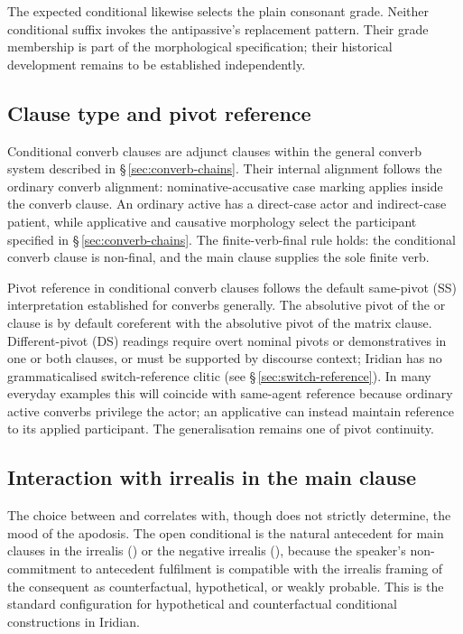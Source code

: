 The expected conditional  likewise selects the plain consonant
grade. Neither conditional suffix invokes the antipassive's replacement
pattern. Their grade membership is part of the morphological specification;
their historical development remains to be established independently.

\subsection{Clause type and pivot reference}\label{sec:cond-subj}

Conditional converb clauses are adjunct clauses within the general converb
system described in §\,\ref{sec:converb-chains}. Their internal alignment
follows the ordinary converb alignment: nominative-accusative case marking
applies inside the converb clause. An ordinary active has a direct-case actor
and indirect-case patient, while applicative and causative morphology select
the participant specified in §\,\ref{sec:converb-chains}. The
finite-verb-final rule holds: the conditional converb clause is non-final, and
the main clause supplies the sole finite verb.

Pivot reference in conditional converb clauses follows the default same-pivot
(SS) interpretation established for converbs generally. The absolutive pivot of
the  or  clause is by default coreferent with the absolutive
pivot of the matrix clause. Different-pivot (DS) readings require overt nominal
pivots or demonstratives in one or both clauses, or must be supported by
discourse context; Iridian has no grammaticalised switch-reference clitic (see
§\,\ref{sec:switch-reference}). In many everyday examples this will coincide
with same-agent reference because ordinary active converbs privilege the
actor; an applicative can instead maintain reference to its applied
participant. The generalisation remains one of pivot continuity.

\subsection{Interaction with irrealis in the main clause}\label{sec:cond-irrealis}

The choice between  and  correlates with, though does not
strictly determine, the mood of the apodosis. The open conditional  is
the natural antecedent for main clauses in the irrealis () or the
negative irrealis (), because the speaker's non-commitment to
antecedent fulfilment is compatible with the irrealis framing of the consequent
as counterfactual, hypothetical, or weakly probable. This is the standard
configuration for hypothetical and counterfactual conditional constructions in
Iridian.

